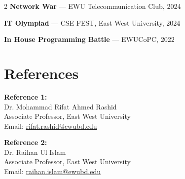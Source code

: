 \documentclass[10pt,a4paper]{article}
\begin{document}
\begin{multicols}{2}
\textbf{Network War} --- EWU Telecommunication Club, 2024

\vspace{1mm}

\textbf{IT Olympiad} --- CSE FEST, East West University, 2024

\vspace{1mm}

\textbf{In House Programming Battle} --- EWUCoPC, 2022


\section{References}

\textbf{Reference 1:} \\
Dr. Mohammad Rifat Ahmed Rashid \\
Associate Professor, East West University \\
Email: \href{mailto:rifat.rashid@ewubd.edu}{rifat.rashid@ewubd.edu}

\vspace{2mm}

\textbf{Reference 2:} \\
Dr. Raihan Ul Islam \\
Associate Professor, East West University \\
Email: \href{mailto:raihan.islam@ewubd.edu}{raihan.islam@ewubd.edu}

\end{multicols}
\end{document}
